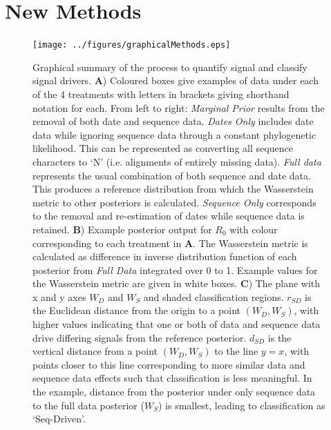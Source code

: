 \documentclass{article}
\begin{document}
\section*{New Methods}


\begin{figure}[H]
\centering
\texttt{[image: ../figures/graphicalMethods.eps]}
\caption{Graphical summary of the process to quantify signal and classify signal drivers.  \textbf{A}) Coloured boxes give examples of data under each of the 4 treatments with letters in brackets giving shorthand notation for each. From left to right: \emph{Marginal Prior} results from the removal of both date and sequence data. \emph{Dates Only} includes date data while ignoring sequence data through a constant phylogenetic likelihood. This can be represented as converting all sequence characters to `N' (i.e. alignments of entirely missing data). \emph{Full data} represents the usual combination of both sequence and date data. This produces a reference distribution from which the Wasserstein metric to other posteriors is calculated. \emph{Sequence Only} corresponds to the removal and re-estimation of dates while sequence data is retained. \textbf{B}) Example posterior output for $R_0$ with colour corresponding to each treatment in \textbf{A}. The Wasserstein metric is calculated as difference in inverse distribution function of each posterior from \emph{Full Data} integrated over 0 to 1. Example values for the Wasserstein metric are given in white boxes. \textbf{C}) The plane with x and y axes $W_D$ and $W_S$ and shaded classification regions. $r_{SD}$ is the Euclidean distance from the origin to a point $(W_D, W_S)$, with higher values indicating that one or both of data and sequence data drive differing signals from the reference posterior. $d_{SD}$ is the vertical distance from a point $(W_D, W_S)$ to the line $y=x$, with points closer to this line corresponding to more similar data and sequence data effects such that classification is less meaningful. In the example, distance from the posterior under only sequence data to the full data posterior ($W_S$) is smallest, leading to classification as `Seq-Driven'.}
\label{fig:method}
\end{figure}
\end{document}
